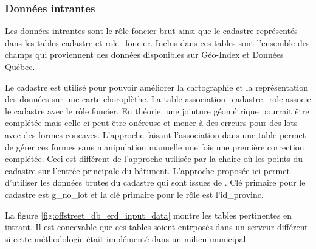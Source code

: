     \subsubsection{Données intrantes}Les données intrantes sont le rôle foncier brut ainsi que le cadastre représentés dans les tables \underline{cadastre} et \underline{role\_foncier}. Inclus dans ces tables sont l'ensemble des champs qui proviennent des données disponibles sur Géo-Index et Données Québec. \par
    Le cadastre est utilisé pour pouvoir améliorer la cartographie et la représentation des données sur une carte choroplèthe. La table \underline{association\_cadastre\_role} associe le cadastre avec le rôle foncier. En théorie, une jointure géométrique pourrait être complétée mais celle-ci peut être onéreuse et mener à des erreurs pour des lots avec des formes concaves. L'approche faisant l'association dans une table permet de gérer ces formes sans manipulation manuelle une fois une première correction complétée. Ceci est différent de l'approche utilisée par la chaire où les points du cadastre sur l'entrée principale du bâtiment. L'approche proposée ici permet d'utiliser les données brutes du cadastre qui sont issues de \textcite{GouvernementduQuebec:ManuelEvaluation:2024}. Clé primaire pour le cadastre est g\_no\_lot et la clé primaire pour le rôle est l'id\_provinc.\par
    La figure \ref{fig:offstreet_db_erd_input_data} montre les tables pertinentes en intrant. Il est concevable que ces tables soient entrposés dans un serveur différent si cette méthodologie était implémenté dans un milieu municipal.
